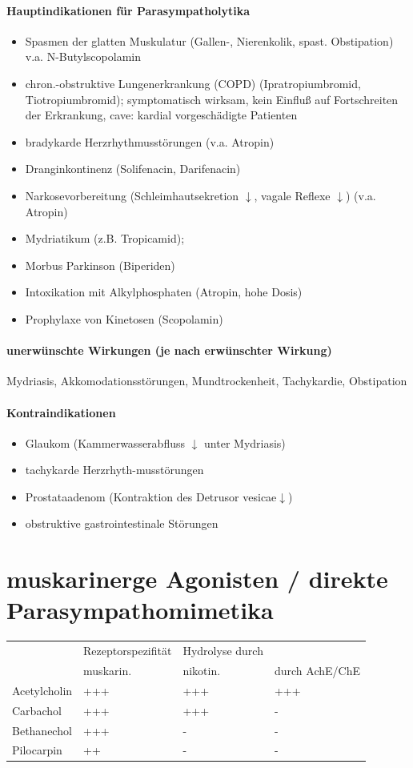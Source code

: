 \documentclass[10pt,a4paper]{report}
\begin{document}
\paragraph{Hauptindikationen für Parasympatholytika}
\begin{itemize}
	\item Spasmen der glatten Muskulatur (Gallen-, Nierenkolik, spast. Obstipation)
	v.a. N-Butylscopolamin
	\item chron.-obstruktive Lungenerkrankung (COPD) (Ipratropiumbromid, Tiotropiumbromid); symptomatisch wirksam, kein Einfluß auf Fortschreiten der Erkrankung, cave: kardial vorgeschädigte Patienten
	\item bradykarde Herzrhythmusstörungen (v.a. Atropin)
	\item Dranginkontinenz (Solifenacin, Darifenacin)
	\item Narkosevorbereitung (Schleimhautsekretion $\downarrow$, vagale Reflexe $\downarrow$) (v.a. Atropin)
	\item Mydriatikum (z.B. Tropicamid); 
	\item Morbus Parkinson (Biperiden)
	\item Intoxikation mit Alkylphosphaten (Atropin, hohe Dosis) 
	\item Prophylaxe von Kinetosen (Scopolamin) 
\end{itemize}
\paragraph{unerwünschte Wirkungen (je nach erwünschter Wirkung)}
Mydriasis, Akkomodationsstörungen, Mundtrockenheit, Tachykardie, Obstipation 
\paragraph{Kontraindikationen}
\begin{itemize}
	\item Glaukom (Kammerwasserabfluss $\downarrow$ unter Mydriasis)  
	\item tachykarde Herzrhyth-musstörungen  
	\item Prostataadenom (Kontraktion des Detrusor vesicae$\downarrow$) 
	\item obstruktive gastrointestinale Störungen
\end{itemize}
\section{muskarinerge Agonisten / direkte Parasympathomimetika}
\begin{tabularx}{\textwidth}{XXXX}
&Rezeptorspezifität&Hydrolyse durch&\\
&muskarin.&nikotin.&durch AchE/ChE\\
Acetylcholin&+++&+++&+++\\
Carbachol&+++&+++&-\\
Bethanechol&+++&-&-\\
Pilocarpin&++&-&-\\
\end{tabularx}
\end{document}

